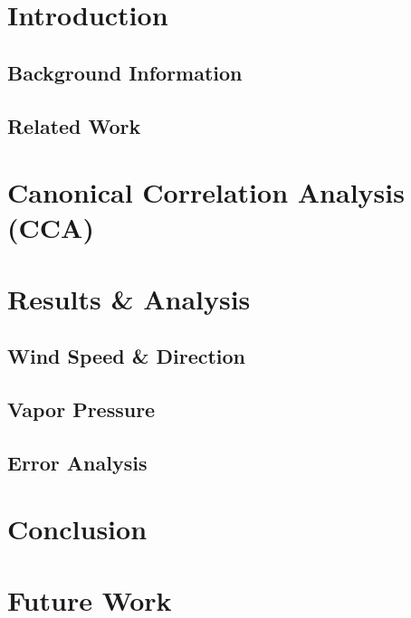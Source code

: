 \chapter{Introduction}
\label{cpt:intro}

\section{Background Information}

\section{Related Work}

\chapter{Canonical Correlation Analysis (CCA)}
\label{cpt:cca}

\chapter{Results \& Analysis}
\label{cpt:results}

\section{Wind Speed \& Direction}

\section{Vapor Pressure}

\section{Error Analysis}

\chapter{Conclusion}
\label{cpt:conclusion}

\chapter{Future Work}
\label{cpt:future}